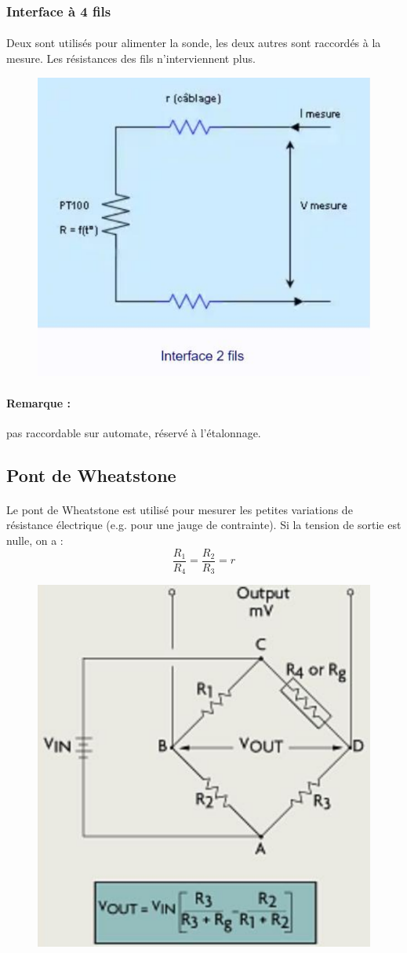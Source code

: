 \documentclass{article}
\begin{document}
\subsubsection{Interface à 4 fils}
\paragraph{}
Deux sont utilisés pour alimenter la sonde, les deux autres sont raccordés à la mesure. Les résistances des fils n'interviennent plus.

\begin{figure}[H]
    \centering
    \includegraphics[width=0.43\linewidth]{./images/2fils.png}
\end{figure}

\paragraph{Remarque :} pas raccordable sur automate, réservé à l'étalonnage.

\subsection{Pont de Wheatstone}
\paragraph{}
Le pont de Wheatstone est utilisé pour mesurer les petites variations de résistance électrique (e.g. pour une jauge de contrainte). Si la tension de sortie est nulle, on a :
$$\frac{R_1}{R_4} = \frac{R_2}{R_3} = r$$

\begin{figure}[H]
    \centering
    \includegraphics[width=0.35\linewidth]{./images/wheatstone.png}
\end{figure}
\end{document}
